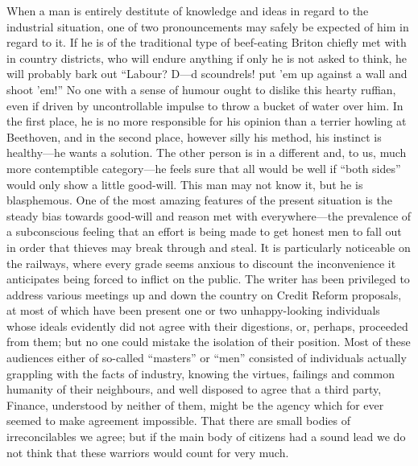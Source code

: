 \documentclass{book}
\begin{document}
When a man is entirely destitute of knowledge and ideas in regard to the industrial situation, one of two pronouncements may safely be expected of him in regard to it. If he is of the traditional type of beef-eating Briton chiefly met with in country districts, who will endure anything if only he is not asked to think, he will probably bark out “Labour? D—d scoundrels! put ’em up against a wall and shoot ’em!” No one with a sense of humour ought to dislike this hearty ruffian, even if driven by uncontrollable impulse to throw a bucket of water over him. In the first place, he is no more responsible for his opinion than a terrier howling at Beethoven, and in the second place, however silly his method, his instinct is healthy—he wants a solution. The other person is in a different and, to us, much more contemptible category—he feels sure that all would be well if “both sides” would only show a little good-will. This man may not know it, but he is blasphemous. One of the most amazing features of the present situation is the steady bias towards good-will and reason met with everywhere—the prevalence of a subconscious feeling that an effort is being made to get honest men to fall out in order that thieves may break through and steal. It is particularly noticeable on the railways, where every grade seems anxious to discount the inconvenience it anticipates being forced to inflict on the public. The writer has been privileged to address various meetings up and down the country on Credit Reform proposals, at most of which have been present one or two unhappy-looking individuals whose ideals evidently did not agree with their digestions, or, perhaps, proceeded from them; but no one could mistake the isolation of their position. Most of these audiences either of so-called “masters” or “men” consisted of individuals actually grappling with the facts of industry, knowing the virtues, failings and common humanity of their neighbours, and well disposed to agree that a third party, Finance, understood by neither of them, might be the agency which for ever seemed to make agreement impossible. That there are small bodies of irreconcilables we agree; but if the main body of citizens had a sound lead we do not think that these warriors would count for very much.
\end{document}
